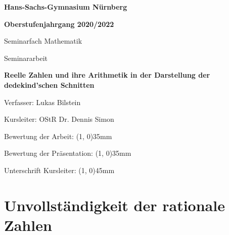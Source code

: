 \documentclass[12pt]{article}
\begin{document}
    \thispagestyle{empty}

    {
        \centering

        \begin{singlespace}

        \textbf{Hans-Sachs-Gymnasium Nürnberg}

        \textbf{Oberstufenjahrgang 2020/2022}

        \end{singlespace}

        \bigskip

        Seminarfach Mathematik

        \bigskip

        Seminararbeit

        \bigskip
        \bigskip

        \textbf{Reelle Zahlen und ihre Arithmetik in der Darstellung der dedekind'schen Schnitten}

        \bigskip
        \bigskip

    }

    \hspace*{30mm}Verfasser: \hspace*{22mm} Lukas Bilstein

    \bigskip

    \hspace*{30mm}Kursleiter: \hspace*{20mm} OStR Dr. Dennis Simon

    \bigskip

    \hspace*{30mm}Bewertung der Arbeit: \hspace*{10mm} \line(1, 0){35mm}

    \bigskip

    \hspace*{30mm}Bewertung der Präsentation: \line(1, 0){35mm}

    \bigskip
    \bigskip
    \bigskip
    \bigskip
    \bigskip

    \hspace*{30mm}Unterschrift Kursleiter: \hspace*{8mm} \line(1, 0){45mm}

    \newpage

    \thispagestyle{empty}

    \tableofcontents

    \newpage

    \setcounter{page}{3}

    \section{Unvollständigkeit der rationale Zahlen}
\end{document}
